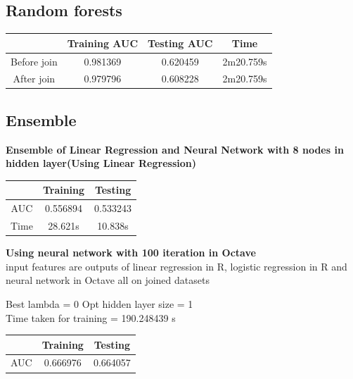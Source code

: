 \documentclass[10pt]{article}
\begin{document}
\subsection{Random forests}

\begin{center}
 \begin{tabular}{|c | c | c | c||} 
 \hline
 & Training AUC & Testing AUC & Time\\ [0.5ex] 
 \hline\hline
Before join & 0.981369 & 0.620459 & 2m20.759s\\
 \hline
After join & 0.979796 & 0.608228 & 2m20.759s\\ 
 \hline
\end{tabular}
\end{center}

\subsection{Ensemble}
\textbf{Ensemble of Linear Regression and Neural Network with 8 nodes in hidden layer(Using Linear Regression)}\\

\begin{center}
 \begin{tabular}{|c | c | c||} 
 \hline
 & Training & Testing\\ [0.5ex] 
 \hline\hline
AUC & 0.556894 & 0.533243\\ 
 \hline
Time & 28.621s & 10.838s\\ 
 \hline
\end{tabular}
\end{center}

\textbf{Using neural network with 100 iteration in Octave}\\
input features are outputs of linear regression in R, logistic regression in R and neural network in Octave all on joined datasets

	Best lambda = 0 Opt hidden layer size = 1 
\\
	Time taken for training = 190.248439 s
\\
\begin{center}
 \begin{tabular}{|c | c | c ||} 
 \hline
 & Training & Testing\\ [0.5ex] 
 \hline\hline
AUC & 0.666976 & 0.664057\\
 \hline
\end{tabular}
\end{center}
\end{document}
